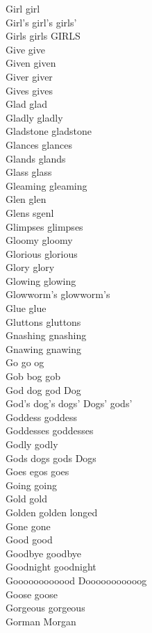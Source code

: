 Girl girl\\
Girl's girl's girls'\\
Girls girls GIRLS\\
Give give\\
Given given\\
Giver giver\\
Gives gives\\
Glad glad\\
Gladly gladly\\
Gladstone gladstone\\
Glances glances\\
Glands glands\\
Glass glass\\
Gleaming gleaming\\
Glen glen\\
Glens sgenl\\
Glimpses glimpses\\
Gloomy gloomy\\
Glorious glorious\\
Glory glory\\
Glowing glowing\\
Glowworm's glowworm's\\
Glue glue\\
Gluttons gluttons\\
Gnashing gnashing\\
Gnawing gnawing\\
Go go og\\
Gob bog gob\\
God dog god Dog\\
God's dog's dogs' Dogs' gods'\\
Goddess goddess\\
Goddesses goddesses\\
Godly godly\\
Gods dogs gods Dogs\\
Goes egos goes\\
Going going\\
Gold gold\\
Golden golden longed\\
Gone gone\\
Good good\\
Goodbye goodbye\\
Goodnight goodnight\\
Goooooooooood Dooooooooooog\\
Goose goose\\
Gorgeous gorgeous\\
Gorman Morgan\\

